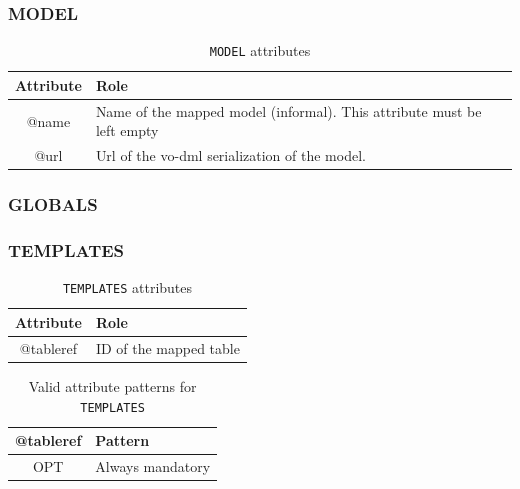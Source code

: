 \documentclass[11pt,a4paper]{ivoa}
\begin{document}
\subsubsection{MODEL}

\begin{table}[!htbp]
\small
\centering
\begin{tabulary}{\linewidth}{|c|J|}       
       \hline 
            \textbf{Attribute} & 
            \textbf {Role}\\
       \hline         \hline  
            @name  & 
            Name of the mapped model (informal).  This attribute must be left empty  \\
       \hline 
            @url & 
            Url of the vo-dml serialization of the model. \\
       \hline 
     \end{tabulary}
     \caption{\texttt{MODEL} attributes} 
     \label{tbl:model-att}
 \end{table}

\FloatBarrier

\subsubsection{GLOBALS}

\FloatBarrier

\subsubsection{TEMPLATES}

\begin{table}[!htbp]
\small
\centering
\begin{tabulary}{\linewidth}{|c|J|}       
       \hline 
            \textbf{Attribute} & 
            \textbf {Role}\\
       \hline         \hline  
            @tableref & 
            ID of the mapped table  \\
        \hline 
     \end{tabulary}
     \caption{\texttt{TEMPLATES} attributes} 
     \label{tbl:templates-att}
 \end{table}

\begin{table}[!htbp]
\small
\centering
\begin{tabulary}{\linewidth}{|c|J|}
    \hline 
        \textbf{@tableref} &
        \textbf{Pattern}\\
    \hline      \hline  
        OPT &           
        Always mandatory\\
   \hline 
\end{tabulary}
     \caption{Valid attribute patterns for  \texttt{TEMPLATES}} 
     \label{tbl:templates-pattern}
 \end{table}
 
\end{document}
